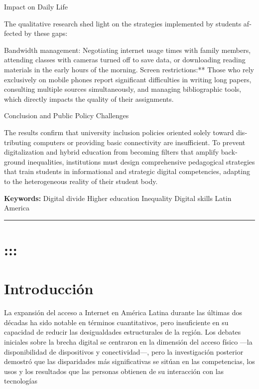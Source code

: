 \documentclass{article}
\begin{document}
\begin{tcolorbox}[colback=brown!8!white,colframe=brown!8!white,boxrule=0pt,arc=2pt,left=4pt,right=4pt,top=3pt,bottom=3pt,before skip=4pt,after skip=4pt]
\begin{otherlanguage}{english}
Impact on Daily Life

The qualitative research shed light on the strategies implemented by students affected by these gaps:

Bandwidth management: Negotiating internet usage times with family members, attending classes with cameras turned off to save data, or downloading reading materials in the early hours of the morning.
Screen restrictions:** Those who rely exclusively on mobile phones report significant difficulties in writing long papers, consulting multiple sources simultaneously, and managing bibliographic tools, which directly impacts the quality of their assignments.

Conclusion and Public Policy Challenges

The results confirm that university inclusion policies oriented solely toward distributing computers or providing basic connectivity are insufficient. To prevent digitalization and hybrid education from becoming filters that amplify background inequalities, institutions must design comprehensive pedagogical strategies that train students in informational and strategic digital competencies, adapting to the heterogeneous reality of their student body.
\par\smallskip\noindent\textbf{Keywords:} Digital divide Higher education Inequality Digital skills Latin America
\end{otherlanguage}
\end{tcolorbox}

\bigskip
\noindent\rule{\linewidth}{0.4pt}
\bigskip

\section{:::}

\section{Introducción}
La expansión del acceso a Internet en América Latina durante las últimas dos décadas ha sido notable en términos cuantitativos, pero insuficiente en su capacidad de reducir las desigualdades estructurales de la región. Los debates iniciales sobre la brecha digital se centraron en la dimensión del acceso físico —la disponibilidad de dispositivos y conectividad—, pero la investigación posterior demostró que las disparidades más significativas se sitúan en las competencias, los usos y los resultados que las personas obtienen de su interacción con las tecnologías \autocite{2562-WARSCHAUER2024} \autocite*{2565-HARGITTAI2002}
\end{document}
